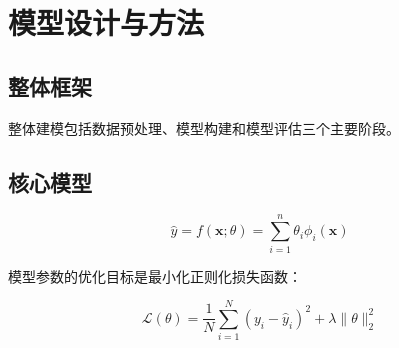 \section{模型设计与方法}

\subsection{整体框架}

整体建模包括数据预处理、模型构建和模型评估三个主要阶段。

\subsection{核心模型}

\[
  \hat{y} = f(\mathbf{x}; \theta) = \sum_{i=1}^{n} \theta_i \phi_i(\mathbf{x})
\]

模型参数的优化目标是最小化正则化损失函数：

\[
  \mathcal{L}(\theta) = \frac{1}{N} \sum_{i=1}^{N} (y_i - \hat{y}_i)^2 + \lambda \|\theta\|_2^2
\]
